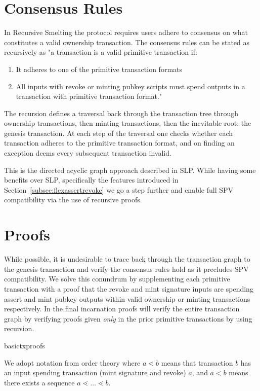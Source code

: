\documentclass[9pt,oneside]{amsart}
\begin{document}
\begin{multicols}{2}
\section{Consensus Rules}
In Recursive Smelting the protocol requires users adhere to consensus on what constitutes a valid ownership transaction. The consensus rules can be stated as recursively as "a  transaction is a valid primitive transaction if:
    \begin{enumerate}
        \item It adheres to one of the primitive transaction formats 
        \item All inputs with revoke or minting pubkey scripts must  spend outputs in a transaction with primitive transaction format."
    \end{enumerate}
    
The recursion defines a traversal back through the transaction tree through ownership transactions, then minting transactions, then the inevitable root: the genesis transaction. At each step of the traversal one checks whether each transaction adheres to the primitive transaction format, and on finding an exception deems every subsequent transaction invalid.

This is the directed acyclic graph approach described in SLP. While having some benefits over SLP, specifically the features introduced in Section~\ref{subsec:flexassertrevoke} we go a step further and enable full SPV compatibility via the use of recursive proofs.
    
\section{Proofs}
While possible, it is undesirable to trace back through the transaction graph to the genesis transaction and verify the consensus rules hold as it precludes SPV compatibility. We solve this conundrum by supplementing each primitive transaction with a proof that the revoke and mint signature inputs are spending assert and mint pubkey outputs within valid ownership or minting transactions respectively. In the final incarnation proofs will verify the entire transaction graph by verifying proofs given \emph{only} in the prior primitive transactions by using recursion.

\begin{center}
    {basictxproofs}
\end{center}

We adopt notation from order theory where $a \lessdot b$ means that transaction $b$ has an input spending transaction (mint signature and revoke) $a$, and $a < b$ means there exists a sequence $a \lessdot \dots \lessdot b$.

\end{multicols}
\end{document}
